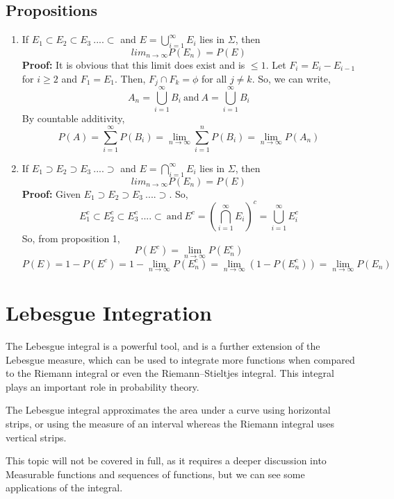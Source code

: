 \documentclass{article}
\begin{document}
\subsection{Propositions}
\begin{enumerate}
	\item If $E_1 \subset E_2 \subset E_3 \ ....\subset$ and $E = \bigcup \limits_{i=1}^\infty E_i$ lies in $\Sigma$, then 
	$$lim_{n \rightarrow \infty}P(E_n) = P(E)$$
	\textbf{Proof: }It is obvious that this limit does exist and is $\leq 1$. Let $F_i = E_i - E_{i-1}$ for $i \geq 2$ and $F_1 = E_1$. Then, $F_j \cap F_k = \phi$ for all $j \neq k$. So, we can write,
	$$A_n = \bigcup \limits_{i=1}^\infty B_i \ \textrm{and}\  A = \bigcup \limits_{i=1}^\infty B_i$$
	By countable additivity,
	$$P(A) = \sum \limits_{i=1}^\infty P(B_i) = \lim_{n \rightarrow \infty } \sum \limits_{i=1}^n P(B_i) = \lim_{n \rightarrow \infty}P(A_n) $$
	\item If $E_1 \supset E_2 \supset E_3 \ ....\supset$ and $E = \bigcap \limits_{i=1}^\infty E_i$ lies in $\Sigma$, then 
	$$lim_{n \rightarrow \infty}P(E_n) = P(E)$$
	\textbf{Proof: } Given $E_1 \supset E_2 \supset E_3 \ ....\supset$. So, $$E_1^c \subset E_2^c \subset E_3^c \ ....\subset \ \textrm{and}\  E^c =  (\bigcap \limits_{i=1}^\infty E_i)^c = \bigcup \limits_{i=1}^\infty E_i^c$$
	So, from proposition 1,
	$$P(E^c) = \lim_{n \rightarrow \infty}P(E_n^c)$$
	$$P(E) = 1 - P(E^c) = 1 - \lim_{n \rightarrow \infty}P(E_n^c) = \lim_{n \rightarrow \infty}(1- P(E_n^c)) = \lim_{n \rightarrow \infty}P(E_n)$$

\end{enumerate}

\section{Lebesgue Integration}

The Lebesgue integral is a powerful tool, and is a further extension of the Lebesgue measure, which can be used to integrate more functions when compared to the Riemann integral or even the Riemann–Stieltjes integral. 
This integral plays an important role in probability theory.

The Lebesgue integral approximates the area under a curve using horizontal strips, or using the measure of an interval whereas the Riemann integral uses vertical strips.

This topic will not be covered in full, as it requires a deeper discussion into Measurable functions and sequences of functions, but we can see some applications of the integral.
\end{document}
